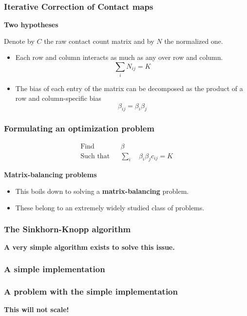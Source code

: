 \documentclass[xcolor=dvipsnames]{beamer}
\begin{document}
\begin{frame}
\frametitle{Iterative Correction of Contact maps}
{\bf \color{Blue} Two hypotheses}

Denote by $C$ the raw contact count matrix and by $N$ the normalized one.

\begin{itemize}[label={$\bullet$}]
\item Each row and column interacts as much as any over row and column.
$$
\sum_{i} N_{ij} = K
$$
\item The bias of each entry of the matrix can be decomposed as the product of
a row and column-specific bias
$$
\beta_{ij} = \beta_i \beta_j
$$
\end{itemize}
\end{frame}

\begin{frame}
\frametitle{Formulating an optimization problem}
\begin{equation*}
\renewcommand{\arraystretch}{2}
\begin{array}{ccll}
\text{Find} & & \beta \\
\text{Such that} & & \underset{i}{\sum} \quad \beta_i \beta_j c_{ij} = K
\end{array}
\end{equation*}

\vspace{1em}
{\bf \color{Blue} Matrix-balancing problems} \\
\begin{itemize}[label={$\bullet$}]
\item This boils down to solving a {\bf matrix-balancing} problem.
\item These belong to an extremely widely studied class of problems.
\end{itemize}
\end{frame}

\begin{frame}
\frametitle{The Sinkhorn-Knopp algorithm}
{\bf \color{Blue} A very simple algorithm exists to solve this issue.}

\end{frame}

\begin{frame}
\frametitle{A simple implementation}

\end{frame}

\begin{frame}
\frametitle{A problem with the simple implementation}
\begin{center}
\begin{centering}
{\bf \color{Red} \Large This will not scale!}
\end{centering}
\end{center}
\end{frame}
\end{document}
